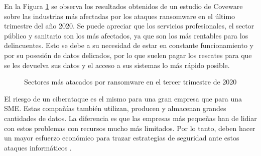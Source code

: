 
En la Figura \ref{fig:cove-es} se observa los resultados obtenidos de un estudio de Coveware \cite{4} sobre las industrias más afectadas por los ataques ransomware en el último trimestre del año 2020. Se puede apreciar que los servicios profesionales, el sector público y sanitario son los más afectados, ya que son los más rentables para los delincuentes. Esto se debe a su necesidad de estar en constante funcionamiento y por su posesión de datos delicados, por lo que suelen pagar los rescates para que se les devuelva sus datos y el acceso a sus sistemas lo más rápido posible.

\begin{figure}[h!]
\begin{center}
{}
\end{center}
\caption{Sectores más atacados por ransomware en el tercer trimestre de 2020}
\label{fig:cove-es}
\end{figure}

El riesgo de un ciberataque es el mismo para una gran empresa que para una \gls{SME}. Estas compañías también utilizan, producen y almacenan grandes cantidades de datos. La diferencia es que las empresas más pequeñas han de lidiar con estos problemas con recursos mucho más limitados. Por lo tanto, deben hacer un mayor esfuerzo económico para trazar estrategias de seguridad ante estos ataques informáticos \cite{KURPJUHN20155}.

